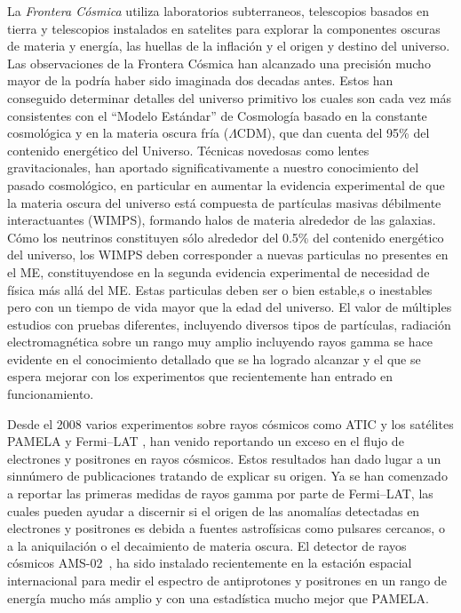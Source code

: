 La \emph{Frontera Cósmica} utiliza laboratorios subterraneos, telescopios
basados en tierra y telescopios instalados en satelites para explorar
la componentes oscuras de materia y energía, las huellas de la
inflación y el origen y destino del universo. Las observaciones de la
Frontera Cósmica han alcanzado una precisión mucho mayor de la podría
haber sido imaginada dos decadas antes. Estos han conseguido
determinar detalles del universo primitivo los cuales son cada vez más
consistentes con el ``Modelo Estándar'' de Cosmología basado en la
constante cosmológica y en la materia oscura fría ($\Lambda$CDM), que
dan cuenta del 95\% del contenido energético del Universo. Técnicas
novedosas como lentes gravitacionales, han aportado significativamente
a nuestro conocimiento del pasado cosmológico, en particular en
aumentar la evidencia experimental de que la materia oscura del universo
está compuesta de partículas masivas débilmente interactuantes (WIMPS),
formando halos de materia alrededor de las galaxias. Cómo los 
neutrinos constituyen sólo alrededor del 0.5\% del contenido energético
del universo, los WIMPS deben corresponder a nuevas particulas no
presentes en el ME, constituyendose en la segunda evidencia
experimental de necesidad de física más allá del ME. Estas particulas
deben ser o bien estable,s o inestables pero con un tiempo de vida
mayor que la edad del universo.  El valor de múltiples
estudios con pruebas diferentes, incluyendo diversos tipos de
partículas, radiación electromagnética sobre un rango muy amplio
incluyendo rayos gamma se hace evidente en el conocimiento detallado
que se ha logrado alcanzar y el que se espera mejorar con los
experimentos que recientemente han entrado en funcionamiento.

Desde el 2008 varios experimentos sobre rayos cósmicos como ATIC
\cite{:2008zzr} y los satélites PAMELA \cite{Adriani:2008zr} y
Fermi--LAT \cite{Abdo:2009zk}, han venido reportando un exceso en el
flujo de electrones y positrones en rayos cósmicos. Estos resultados
han dado lugar a un sinnúmero de publicaciones tratando de explicar su
origen. Ya se han comenzado a reportar las primeras medidas de rayos
gamma por parte de Fermi--LAT, las cuales pueden ayudar a discernir si
el origen de las anomalías detectadas en electrones y positrones es
debida a fuentes astrofísicas como pulsares cercanos, o a la
aniquilación o el decaimiento de materia oscura. El detector de rayos
cósmicos AMS-02~\cite{ams:2009}, ha sido instalado recientemente en la
estación espacial internacional para medir el espectro de antiprotones
y positrones en un rango de energía mucho más amplio y con una
estadística mucho mejor que PAMELA.

